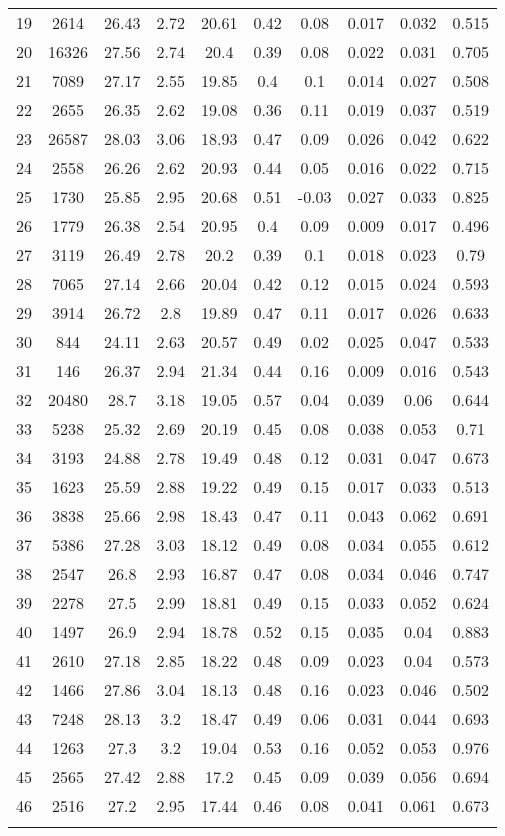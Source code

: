 \begin{tabular}{@{\extracolsep{2pt}} cccccccccc}
19 & 2614 & 26.43 & 2.72 & 20.61 & 0.42 & 0.08 & 0.017 & 0.032 & 0.515 \\ 
20 & 16326 & 27.56 & 2.74 & 20.4 & 0.39 & 0.08 & 0.022 & 0.031 & 0.705 \\ 
21 & 7089 & 27.17 & 2.55 & 19.85 & 0.4 & 0.1 & 0.014 & 0.027 & 0.508 \\ 
22 & 2655 & 26.35 & 2.62 & 19.08 & 0.36 & 0.11 & 0.019 & 0.037 & 0.519 \\ 
23 & 26587 & 28.03 & 3.06 & 18.93 & 0.47 & 0.09 & 0.026 & 0.042 & 0.622 \\ 
24 & 2558 & 26.26 & 2.62 & 20.93 & 0.44 & 0.05 & 0.016 & 0.022 & 0.715 \\ 
25 & 1730 & 25.85 & 2.95 & 20.68 & 0.51 & -0.03 & 0.027 & 0.033 & 0.825 \\ 
26 & 1779 & 26.38 & 2.54 & 20.95 & 0.4 & 0.09 & 0.009 & 0.017 & 0.496 \\ 
27 & 3119 & 26.49 & 2.78 & 20.2 & 0.39 & 0.1 & 0.018 & 0.023 & 0.79 \\ 
28 & 7065 & 27.14 & 2.66 & 20.04 & 0.42 & 0.12 & 0.015 & 0.024 & 0.593 \\ 
29 & 3914 & 26.72 & 2.8 & 19.89 & 0.47 & 0.11 & 0.017 & 0.026 & 0.633 \\ 
30 & 844 & 24.11 & 2.63 & 20.57 & 0.49 & 0.02 & 0.025 & 0.047 & 0.533 \\ 
31 & 146 & 26.37 & 2.94 & 21.34 & 0.44 & 0.16 & 0.009 & 0.016 & 0.543 \\ 
32 & 20480 & 28.7 & 3.18 & 19.05 & 0.57 & 0.04 & 0.039 & 0.06 & 0.644 \\ 
33 & 5238 & 25.32 & 2.69 & 20.19 & 0.45 & 0.08 & 0.038 & 0.053 & 0.71 \\ 
34 & 3193 & 24.88 & 2.78 & 19.49 & 0.48 & 0.12 & 0.031 & 0.047 & 0.673 \\ 
35 & 1623 & 25.59 & 2.88 & 19.22 & 0.49 & 0.15 & 0.017 & 0.033 & 0.513 \\ 
36 & 3838 & 25.66 & 2.98 & 18.43 & 0.47 & 0.11 & 0.043 & 0.062 & 0.691 \\ 
37 & 5386 & 27.28 & 3.03 & 18.12 & 0.49 & 0.08 & 0.034 & 0.055 & 0.612 \\ 
38 & 2547 & 26.8 & 2.93 & 16.87 & 0.47 & 0.08 & 0.034 & 0.046 & 0.747 \\ 
39 & 2278 & 27.5 & 2.99 & 18.81 & 0.49 & 0.15 & 0.033 & 0.052 & 0.624 \\ 
40 & 1497 & 26.9 & 2.94 & 18.78 & 0.52 & 0.15 & 0.035 & 0.04 & 0.883 \\ 
41 & 2610 & 27.18 & 2.85 & 18.22 & 0.48 & 0.09 & 0.023 & 0.04 & 0.573 \\ 
42 & 1466 & 27.86 & 3.04 & 18.13 & 0.48 & 0.16 & 0.023 & 0.046 & 0.502 \\ 
43 & 7248 & 28.13 & 3.2 & 18.47 & 0.49 & 0.06 & 0.031 & 0.044 & 0.693 \\ 
44 & 1263 & 27.3 & 3.2 & 19.04 & 0.53 & 0.16 & 0.052 & 0.053 & 0.976 \\ 
45 & 2565 & 27.42 & 2.88 & 17.2 & 0.45 & 0.09 & 0.039 & 0.056 & 0.694 \\ 
46 & 2516 & 27.2 & 2.95 & 17.44 & 0.46 & 0.08 & 0.041 & 0.061 & 0.673 \\ 
\hline \\[-1.8ex] 
\end{tabular} 
